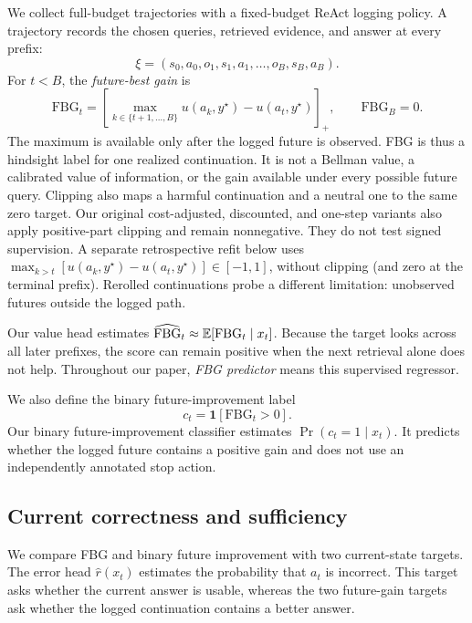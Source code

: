 We collect full-budget trajectories with a fixed-budget ReAct logging policy. A
trajectory records the chosen queries, retrieved evidence, and answer at every
prefix:
\[
\xi=(s_0,a_0,o_1,s_1,a_1,\ldots,o_B,s_B,a_B).
\]
For $t<B$, the \emph{future-best gain} is
\begin{equation}
\mathrm{FBG}_t=
\left[\max_{k\in\{t+1,\ldots,B\}}
u(a_k,y^\star)-u(a_t,y^\star)\right]_+,
\qquad \mathrm{FBG}_B=0.
\label{eq:fbg}
\end{equation}
The maximum is available only after the logged future is observed. FBG is thus
a hindsight label for one realized continuation. It is not a Bellman value, a
calibrated value of information, or the gain available under every possible
future query. Clipping also maps a harmful continuation and a neutral one to
the same zero target. Our original cost-adjusted, discounted, and one-step
variants also apply positive-part clipping and remain nonnegative. They do not
test signed supervision. A separate retrospective refit below uses
$\max_{k>t}[u(a_k,y^\star)-u(a_t,y^\star)]\in[-1,1]$, without clipping
(and zero at the terminal prefix). Rerolled continuations probe a different
limitation: unobserved futures outside the logged path.

Our value head estimates
$\widehat{\mathrm{FBG}}_t\approx\mathbb{E}[\mathrm{FBG}_t\mid x_t]$. Because the target
looks across all later prefixes, the score can remain positive when the next
retrieval alone does not help. Throughout our paper, \emph{FBG predictor}
means this supervised regressor.

We also define the binary future-improvement label
\begin{equation}
c_t=\mathbf{1}[\mathrm{FBG}_t>0].
\label{eq:future-improvement}
\end{equation}
Our binary future-improvement classifier estimates
$\Pr(c_t=1\mid x_t)$. It predicts whether the logged future contains a
positive gain and does not use an independently annotated stop action.

\subsection{Current correctness and sufficiency}
\label{sec:alternative-signals}

We compare FBG and binary future improvement with two current-state targets.
The error head $\hat r(x_t)$ estimates the probability that $a_t$ is
incorrect. This target asks whether the current answer is usable, whereas the
two future-gain targets ask whether the logged continuation contains a better
answer.

